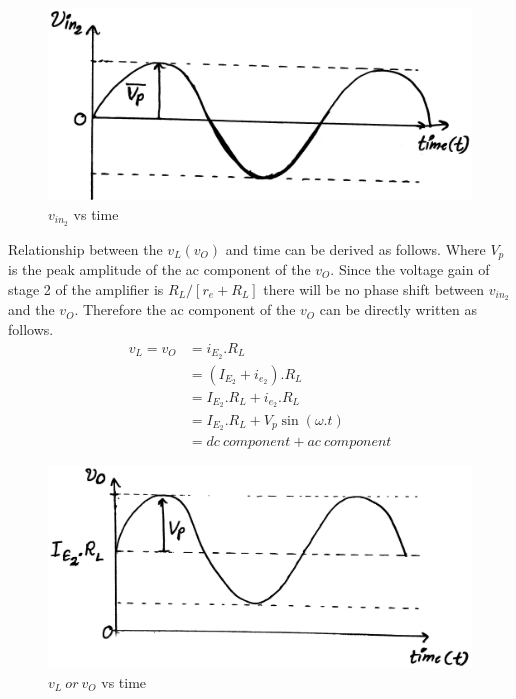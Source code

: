 \documentclass[a4paper,11pt]{article}%
\begin{document}
\begin{figure}[!h]
	\centering
\includegraphics[scale=0.1]{figures/modvin2}
\caption{$v_{in_2}$ vs time}
\end{figure}


\pagebreak
Relationship between the $v_{L}(v_{O})$ and time can be derived as follows.
Where $V_p$ is the peak amplitude of the ac component of the $v_O$. Since the voltage gain of stage 2 of the amplifier is $R_L/\left[ r_e+R_L \right]$ there will be no phase shift between $v_{in_2}$ and the $v_O$. Therefore the ac component of the $v_O$ can be directly written as follows.
\[
\begin{split}
	v_L = v_O &= i_{E_2}.R_L\\
	&= \left( I_{E_2} + i_{e_2} \right).R_L\\
	& = I_{E_2}.R_L + i_{e_2}.R_L\\
	&=  I_{E_2}.R_L + V_p\sin(\omega.t)\\
	&= dc~component + ac~component
\end{split}
\]

\begin{figure}[!h]
	\centering
	\includegraphics[scale=0.11]{figures/modvO}
	\caption{$v_{L}~or~v_{O}$ vs time}
\end{figure}
\end{document}
